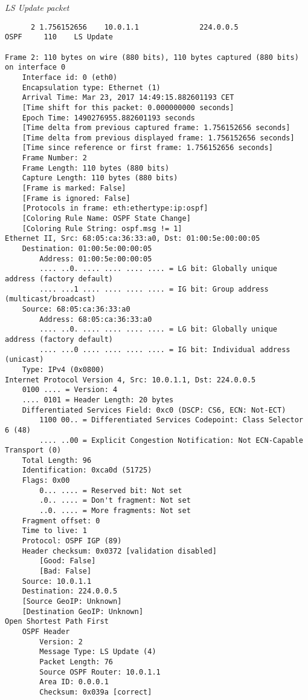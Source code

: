 \textit{LS Update packet}
\begin{lstlisting}
      2 1.756152656    10.0.1.1              224.0.0.5             OSPF     110    LS Update

Frame 2: 110 bytes on wire (880 bits), 110 bytes captured (880 bits) on interface 0
    Interface id: 0 (eth0)
    Encapsulation type: Ethernet (1)
    Arrival Time: Mar 23, 2017 14:49:15.882601193 CET
    [Time shift for this packet: 0.000000000 seconds]
    Epoch Time: 1490276955.882601193 seconds
    [Time delta from previous captured frame: 1.756152656 seconds]
    [Time delta from previous displayed frame: 1.756152656 seconds]
    [Time since reference or first frame: 1.756152656 seconds]
    Frame Number: 2
    Frame Length: 110 bytes (880 bits)
    Capture Length: 110 bytes (880 bits)
    [Frame is marked: False]
    [Frame is ignored: False]
    [Protocols in frame: eth:ethertype:ip:ospf]
    [Coloring Rule Name: OSPF State Change]
    [Coloring Rule String: ospf.msg != 1]
Ethernet II, Src: 68:05:ca:36:33:a0, Dst: 01:00:5e:00:00:05
    Destination: 01:00:5e:00:00:05
        Address: 01:00:5e:00:00:05
        .... ..0. .... .... .... .... = LG bit: Globally unique address (factory default)
        .... ...1 .... .... .... .... = IG bit: Group address (multicast/broadcast)
    Source: 68:05:ca:36:33:a0
        Address: 68:05:ca:36:33:a0
        .... ..0. .... .... .... .... = LG bit: Globally unique address (factory default)
        .... ...0 .... .... .... .... = IG bit: Individual address (unicast)
    Type: IPv4 (0x0800)
Internet Protocol Version 4, Src: 10.0.1.1, Dst: 224.0.0.5
    0100 .... = Version: 4
    .... 0101 = Header Length: 20 bytes
    Differentiated Services Field: 0xc0 (DSCP: CS6, ECN: Not-ECT)
        1100 00.. = Differentiated Services Codepoint: Class Selector 6 (48)
        .... ..00 = Explicit Congestion Notification: Not ECN-Capable Transport (0)
    Total Length: 96
    Identification: 0xca0d (51725)
    Flags: 0x00
        0... .... = Reserved bit: Not set
        .0.. .... = Don't fragment: Not set
        ..0. .... = More fragments: Not set
    Fragment offset: 0
    Time to live: 1
    Protocol: OSPF IGP (89)
    Header checksum: 0x0372 [validation disabled]
        [Good: False]
        [Bad: False]
    Source: 10.0.1.1
    Destination: 224.0.0.5
    [Source GeoIP: Unknown]
    [Destination GeoIP: Unknown]
Open Shortest Path First
    OSPF Header
        Version: 2
        Message Type: LS Update (4)
        Packet Length: 76
        Source OSPF Router: 10.0.1.1
        Area ID: 0.0.0.1
        Checksum: 0x039a [correct]

\end{lstlisting}
